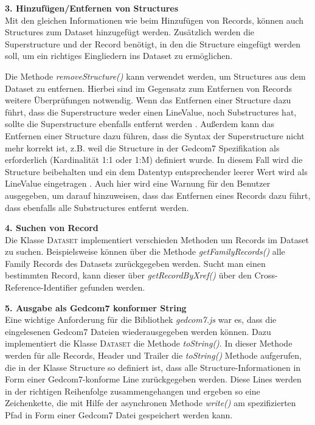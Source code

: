 \vspace{1em}
\textbf{3. Hinzufügen/Entfernen von Structures} \vspace{0.5em} \\
Mit den gleichen Informationen wie beim Hinzufügen von Records, können auch Structures zum Dataset hinzugefügt werden. Zusätzlich werden die Superstructure und der Record benötigt, in den die Structure eingefügt werden soll, um ein richtiges Eingliedern ins Dataset zu ermöglichen. 


Die Methode \textit{removeStructure()} kann verwendet werden, um Structures aus dem Dataset zu entfernen. Hierbei sind im Gegensatz zum Entfernen von Records weitere Überprüfungen notwendig. Wenn das Entfernen einer Structure dazu führt, dass die Superstructure weder einen LineValue, noch Substructures hat, sollte die Superstructure ebenfalls entfernt werden \cite{GEDCOM}. Außerdem kann das Entfernen einer Structure dazu führen, dass die Syntax der Superstructure nicht mehr korrekt ist, z.B. weil die Structure in der Gedcom7 Spezifikation als erforderlich (Kardinalität 1:1 oder 1:M) definiert wurde. In diesem Fall wird die Structure beibehalten und ein dem Datentyp entsprechender leerer Wert wird als LineValue eingetragen \cite{GEDCOM}. Auch hier wird eine Warnung für den Benutzer ausgegeben, um darauf hinzuweisen, dass das Entfernen eines Records dazu führt, dass ebenfalls alle Substructures entfernt werden. 

\vspace{1em}
\textbf{4. Suchen von Record} \vspace{0.5em} \\
Die Klasse \textsc{Dataset} implementiert verschieden Methoden um Records im Dataset zu suchen. Beispielsweise können über die Methode \textit{getFamilyRecords()} alle Family Records des Datasets zurückgegeben werden. Sucht man einen bestimmten Record, kann dieser über \textit{getRecordByXref()} über den Cross-Reference-Identifier gefunden werden. 

\vspace{1em}
\textbf{5. Ausgabe als Gedcom7 konformer String} \vspace{0.5em} \\
Eine wichtige Anforderung für die Bibliothek \textit{gedcom7.js} war es, dass die eingelesenen Gedcom7 Dateien wiederausgegeben werden können. Dazu implementiert die Klasse \textsc{Dataset} die Methode \textit{toString()}. In dieser Methode werden für alle Records, Header und Trailer die \textit{toString()} Methode aufgerufen, die in der Klasse Structure so definiert ist, dass alle Structure-Informationen in Form einer Gedcom7-konforme Line zurückgegeben werden. Diese Lines werden in der richtigen Reihenfolge zusammengehangen und ergeben so eine Zeichenkette, die mit Hilfe der asynchronen Methode \textit{write()} am spezifizierten Pfad in Form einer Gedcom7 Datei gespeichert werden kann.

